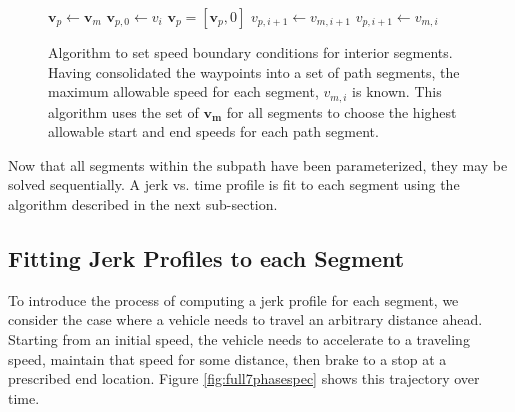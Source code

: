 \documentclass[letterpaper, 10 pt, conference]{ieeeconf}  %
\begin{document}
\begin{figure}
  \begin{algorithmic}[1]
      \State $\mathbf{v}_p \gets \mathbf{v}_m$ 
      \State $\mathbf{v}_{p,0} \gets v_i$ 
      \State $\mathbf{v}_p = [\mathbf{v}_p, 0]$ 
          \State $v_{p,i+1} \gets v_{m,i+1}$
        \Else
          \State $v_{p,i+1} \gets v_{m,i}$
        \EndIf
      \EndFor
    \EndProcedure
  \end{algorithmic}
  \caption{
    Algorithm to set speed boundary conditions for interior segments.
    Having consolidated the waypoints into a set of path segments, the maximum allowable speed for each segment, $v_{m,i}$ is known.
    This algorithm uses the set of $\mathbf{v_{m}}$ for all segments to choose the highest allowable start and end speeds for each path segment.
  }
\label{alg:segmentspeedboundaryconditions}
\end{figure}

Now that all segments within the subpath have been parameterized, they may be solved sequentially.
A jerk vs. time profile is fit to each segment using the algorithm described in the next sub-section.


\subsection{Fitting Jerk Profiles to each Segment} \label{sec:jerkprofiles}

To introduce the process of computing a jerk profile for each segment, we consider the case where a vehicle needs to travel an arbitrary distance ahead.
Starting from an initial speed, the vehicle needs to accelerate to a traveling speed, maintain that speed for some distance, then brake to a stop at a prescribed end location.
Figure \ref{fig:full7phasespec} shows this trajectory over time.
\end{document}
